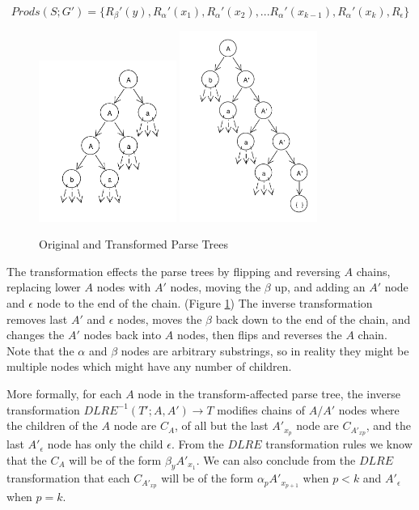 \documentclass[11pt]{article}
\begin{document}
\[Prods(S;G') = \{R_\beta'(y), R_\alpha'(x_1), R_\alpha'(x_2), ... R_\alpha'(x_{k-1}), R_\alpha'(x_k), R_\epsilon\}\]

\begin{figure}[h!]
    \centering
    \includegraphics[width=0.4\textwidth,natwidth=1,natheight=1]{umlet/dlre_orig.pdf}
    \includegraphics[width=0.4\textwidth,natwidth=1,natheight=1]{umlet/dlre_comp.pdf}
    \caption{Original and Transformed Parse Trees}
    \label{fig:dlre}
\end{figure}

The transformation effects the parse trees by flipping and reversing $A$ chains,
replacing lower $A$ nodes with $A'$ nodes, moving the $\beta$ up,
and adding an $A'$ node and $\epsilon$ node to the end of the chain. (Figure \ref{fig:dlre}) The inverse transformation
removes last $A'$ and $\epsilon$ nodes, moves the $\beta$ back down to the end of the chain, and changes the $A'$ nodes back into
$A$ nodes, then flips and reverses the $A$ chain. Note that the $\alpha$ and $\beta$ nodes are arbitrary substrings, so in reality
they might be multiple nodes which might have any number of children.

More formally, for each $A$ node in the transform-affected parse tree, the inverse transformation $DLRE^{-1}(T'; A, A') \rightarrow T$
modifies chains of $A/A'$ nodes where the children of the $A$ node are $C_A$, of all but the last $A'_{x_p}$ node are $C_{A'_{x p}}$,
and the last $A'_\epsilon$ node has only the child $\epsilon$.
From the $DLRE$ transformation rules we know that the $C_A$ will be of the form $\beta_y A'_{x_1}$. 
We can also conclude from the $DLRE$ transformation that each $C_{A'_{x p}}$ will be of the form $\alpha_p A'_{x_{p+1}}$
when $p < k$ and $A'_\epsilon$ when $p=k$. 
\end{document}
